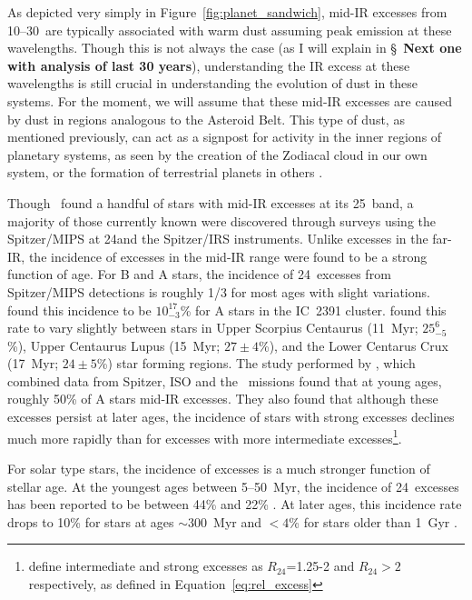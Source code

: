    As depicted very simply in Figure~\ref{fig:planet_sandwich}, mid-IR excesses from 10--30\micron\ are typically associated with warm dust assuming peak emission at these wavelengths. Though this is not always the case (as I will explain in \S~\textbf{Next one with analysis of last 30 years}), understanding the IR excess at these wavelengths is still crucial in understanding the evolution of dust in these systems. For the moment, we will assume that these mid-IR excesses are caused by dust in regions analogous to the Asteroid Belt. This type of dust, as mentioned previously, can act as a signpost for activity in the inner regions of planetary systems, as seen by the creation of the Zodiacal cloud in our own system, or the formation of terrestrial planets in others \citep{Song2005}. 
   
   Though \iras\ found a handful of stars with mid-IR excesses at its 25\micron\ band, a majority of those currently known were discovered through surveys using the Spitzer/MIPS at 24\micron and the Spitzer/IRS instruments. Unlike excesses in the far-IR, the incidence of excesses in the mid-IR range were found to be a strong function of age. For B and A stars, the incidence of 24\micron\ excesses from Spitzer/MIPS detections is roughly 1/3 for most ages \citep{Wyatt2008} with slight variations. \citet{Siegler2007} found this incidence to be $10^{17}_{-3}$\% for A stars in the IC~2391 cluster. \citet{Chen2012} found this rate to vary slightly between stars in Upper Scorpius Centaurus (11~Myr; $25^{6}_{-5}$\%), Upper Centaurus Lupus (15~Myr; $27 \pm 4$\%), and the Lower Centarus Crux (17~Myr; $24 \pm 5$\%) star forming regions. The study performed by \citet{Rieke2005}, which combined data from Spitzer, ISO and the \iras\ missions found that at young ages, roughly 50\% of A stars mid-IR excesses. They also found that although these excesses persist at later ages, the incidence of stars with strong excesses declines much more rapidly than for excesses with more intermediate excesses\footnote{\citet{Rieke2005} define intermediate and strong excesses as $R_{24}$=1.25-2 and $R_{24}>2$ respectively, as defined in Equation~\ref{eq:rel_excess}}.

   For solar type stars, the incidence of excesses is a much stronger function of stellar age. At the youngest ages between 5--50~Myr, the incidence of 24\micron\ excesses has been reported to be between 44\% and 22\% \citep{Siegler2007, Chen2012b}. At later ages, this incidence rate drops to 10\% for stars at ages $\sim$300~Myr \citep{Meyer2008} and $<4$\% for stars older than 1~Gyr \citep{Trilling2008}. 
   
